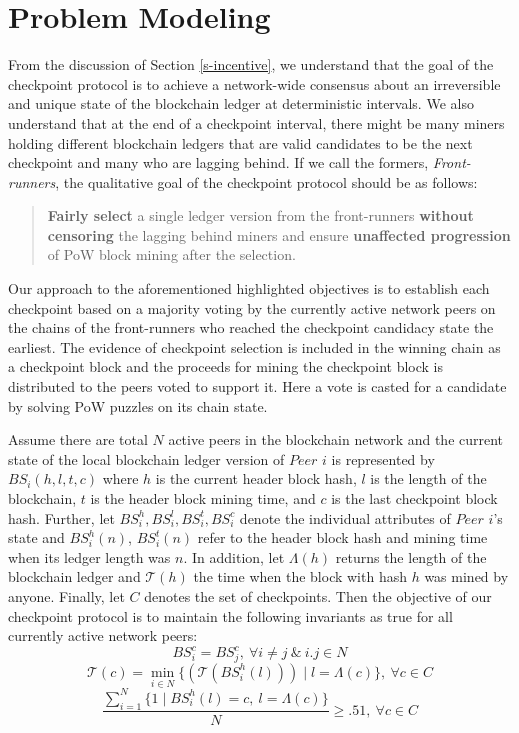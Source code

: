 
\section{Problem Modeling}
\label{s-model}
From the discussion of Section \ref{s-incentive}, we understand that the goal of the checkpoint protocol is to achieve a network-wide consensus about an irreversible and unique state of the blockchain ledger at deterministic intervals. We also understand that at the end of a checkpoint interval, there might be many miners holding different blockchain ledgers that are valid candidates to be the next checkpoint and many who are lagging behind. If we call the formers, \textit{Front-runners}, the qualitative goal of the checkpoint protocol should be as follows:

\begin{quote}
\textbf{Fairly select} a single ledger version from the front-runners \textbf{without censoring} the lagging behind miners and ensure \textbf{unaffected progression} of PoW block mining after the selection.  
\end{quote}

Our approach to the aforementioned highlighted objectives is to establish each checkpoint based on a majority voting by the currently active network peers on the chains of the front-runners who reached the checkpoint candidacy state the earliest. The evidence of checkpoint selection is included in the winning chain as a checkpoint block and the proceeds for mining the checkpoint block is distributed to the peers voted to support it. Here a vote is casted for a candidate by solving PoW puzzles on its chain state.

Assume there are total $N$ active peers in the blockchain network and the current state of the local blockchain ledger version of $Peer$ $i$ is represented by $BS_i(h, l, t, c)$ where $h$ is the current header block hash, $l$ is the length of the blockchain, $t$ is the header block mining time, and $c$ is the last checkpoint block hash. Further, let $BS_i^h, BS_i^l, BS_i^t, BS_i^c$ denote the individual attributes of $Peer$ $i$'s state and $BS_i^h(n)$, $BS_i^t(n)$ refer to the header block hash and mining time when its ledger length was $n$. In addition, let $\Lambda(h)$ returns the length of the blockchain ledger and $\mathcal{T}(h)$ the time when the block with hash $h$ was mined by anyone. Finally, let $C$ denotes the set of checkpoints. Then the objective of our checkpoint protocol is to maintain the following invariants as true for all currently active network peers:
\begin{equation}
\label{e-1}
BS_i^c = BS_j^c,\ \forall i \neq j\ \&\ i.j \in N
\end{equation}
\begin{equation}
\label{e-2}
\mathcal{T}(c) = \min_{i \in N}\{(\mathcal{T}(BS_i^h(l))) \mid l = \Lambda(c)\},\ \forall c \in C  
\end{equation}
\begin{equation}
\label{e-3}
\frac{\sum_{i = 1}^N{\{1 \mid BS_i^h(l) = c,\ l = \Lambda(c)}\}}{N} \geq .51,\ \forall c \in C  
\end{equation}

